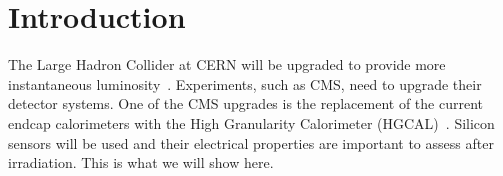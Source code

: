 \section{Introduction}
\label{sec:introduction}

The Large Hadron Collider at CERN will be upgraded to provide more instantaneous luminosity~\cite{hllhc-tdr:2017}.
Experiments, such as CMS, need to upgrade their detector systems. 
One of the CMS upgrades is the replacement of the current endcap calorimeters with the High Granularity Calorimeter (HGCAL)~\cite{hgcal-tdr:2018}.
Silicon sensors will be used and their electrical properties are important to assess after irradiation.
This is what we will show here.